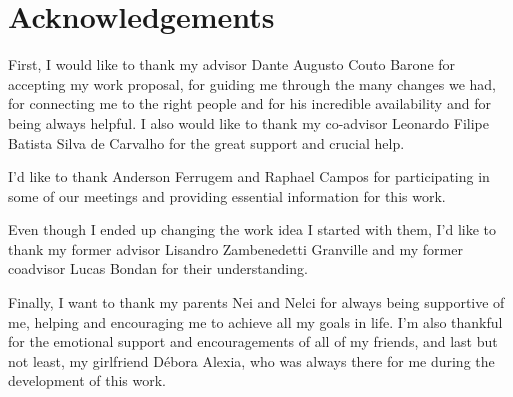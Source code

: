 \chapter*{Acknowledgements}

First, I would like to thank my advisor Dante Augusto Couto Barone for accepting my work proposal, for guiding me through the many changes we had, for connecting me to the right people and for his incredible availability and for being always helpful. I also would like to thank my co-advisor Leonardo Filipe Batista Silva de Carvalho for the great support and crucial help. 

I'd like to thank Anderson Ferrugem and Raphael Campos for participating in some of our meetings and providing essential information for this work.

Even though I ended up changing the work idea I started with them, I'd like to thank my former advisor Lisandro Zambenedetti Granville and my former coadvisor Lucas Bondan for their understanding.

Finally, I want to thank my parents Nei and Nelci for always being supportive of me, helping and encouraging me to achieve all my goals in life. I'm also thankful for the emotional support and encouragements of all of my friends, and last but not least, my girlfriend Débora Alexia, who was always there for me during the development of this work.
\clearpage